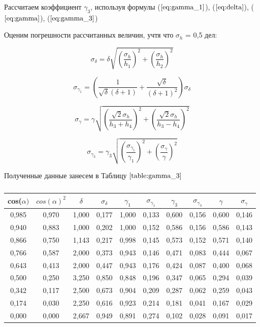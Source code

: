 \documentclass[a4paper,12pt]{article}
\begin{document}
Рассчитаем коэффициент $\gamma_3$, используя формулы ($\ref{eq:gamma_1}$), ($\ref{eq:delta}$), ($\ref{eq:gamma}$), ($\ref{eq:gamma_3}$)

Оценим погрешности рассчитанных величин, учтя что $\sigma_h$ = 0,5 дел:

$$
\sigma_{\delta} = \delta \sqrt{ {\left(\frac{\sigma_h}{h_1}\right)}^2 + {\left(\frac{\sigma_h}{h_2}\right)}^2}	
$$

$$
\sigma_{\gamma_1} = 	\left( \frac{1}{\sqrt{\delta}(\delta + 1)} + \frac{\sqrt{\delta}}{(\delta + 1)^2} \right)  \sigma_{\delta}
$$

$$
\sigma_{\gamma} = \gamma \sqrt{ {\left(\frac{\sqrt{2}\sigma_h}{h_3 + h_4}\right)}^2 + {\left(\frac{\sqrt{2}\sigma_h}{h_3 - h_4}\right)}^2}	
$$

$$
\sigma_{\gamma_3} = \gamma_3 \sqrt{ {\left(\frac{\sigma_{\gamma_1}}{\gamma_1} \right)}^2 + {\left(\frac{\sigma_{\gamma}}{\gamma}\right)}^2}
$$


Полученные данные занесем в Таблицу $\ref{table:gamma_3}$

\newpage

\begin{table}[h!]
\label{table:gamma_3}
\caption{}
\begin{center}
\begin{tabular}{|c|c|c|c|c|c|c|c|c|c|}
\hline
cos($\alpha)$ & $cos(\alpha)^2$ & $\delta$     & $\sigma_{\delta}$  & $\gamma_1$    & $\sigma_{\gamma_1}$ & $\gamma_3$    & $\sigma_{\gamma_3}$ & $\gamma$    & $\sigma_{\gamma}$  \\ \hline
0,985 & 0,970  & 1,000 & 0,177 & 1,000 & 0,133 & 0,600 & 0,156 & 0,600 & 0,146 \\ \hline
0,940 & 0,883  & 1,000 & 0,202 & 1,000 & 0,152 & 0,586 & 0,156 & 0,586 & 0,143 \\ \hline
0,866 & 0,750  & 1,143 & 0,217 & 0,998 & 0,145 & 0,573 & 0,152 & 0,571 & 0,140 \\ \hline
0,766 & 0,587  & 2,000 & 0,373 & 0,943 & 0,146 & 0,471 & 0,083 & 0,444 & 0,067 \\ \hline
0,643 & 0,413  & 2,000 & 0,447 & 0,943 & 0,176 & 0,424 & 0,087 & 0,400 & 0,068 \\ \hline
0,500 & 0,250  & 3,250 & 0,850 & 0,848 & 0,196 & 0,347 & 0,065 & 0,294 & 0,039 \\ \hline
0,342 & 0,117  & 2,500 & 0,673 & 0,904 & 0,209 & 0,287 & 0,062 & 0,259 & 0,043 \\ \hline
0,174 & 0,030  & 2,250 & 0,616 & 0,923 & 0,214 & 0,181 & 0,041 & 0,167 & 0,029 \\ \hline
0,000 & 0,000  & 2,667 & 0,949 & 0,891 & 0,274 & 0,102 & 0,028 & 0,091 & 0,017 \\ \hline
\end{tabular}
\end{center}
\end{table}
\end{document}

